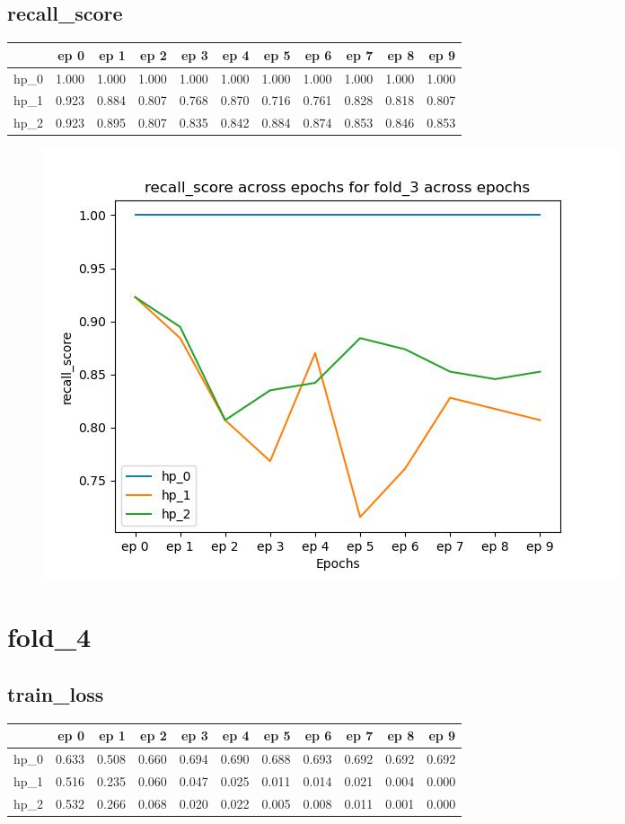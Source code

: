 \documentclass{article}
\begin{document}
\subsection{recall\_score}
\begin{tabular}{lrrrrrrrrrr}
\toprule
{} &   ep 0 &   ep 1 &   ep 2 &   ep 3 &   ep 4 &   ep 5 &   ep 6 &   ep 7 &   ep 8 &   ep 9 \\
\midrule
hp\_0 &  1.000 &  1.000 &  1.000 &  1.000 &  1.000 &  1.000 &  1.000 &  1.000 &  1.000 &  1.000 \\
hp\_1 &  0.923 &  0.884 &  0.807 &  0.768 &  0.870 &  0.716 &  0.761 &  0.828 &  0.818 &  0.807 \\
hp\_2 &  0.923 &  0.895 &  0.807 &  0.835 &  0.842 &  0.884 &  0.874 &  0.853 &  0.846 &  0.853 \\
\bottomrule
\end{tabular}

\begin{figure}[H]
\includegraphics[scale = 0.75]{fold_3/recall_score}
\end{figure}
\section{fold\_4}
\subsection{train\_loss}
\begin{tabular}{lrrrrrrrrrr}
\toprule
{} &   ep 0 &   ep 1 &   ep 2 &   ep 3 &   ep 4 &   ep 5 &   ep 6 &   ep 7 &   ep 8 &   ep 9 \\
\midrule
hp\_0 &  0.633 &  0.508 &  0.660 &  0.694 &  0.690 &  0.688 &  0.693 &  0.692 &  0.692 &  0.692 \\
hp\_1 &  0.516 &  0.235 &  0.060 &  0.047 &  0.025 &  0.011 &  0.014 &  0.021 &  0.004 &  0.000 \\
hp\_2 &  0.532 &  0.266 &  0.068 &  0.020 &  0.022 &  0.005 &  0.008 &  0.011 &  0.001 &  0.000 \\
\bottomrule
\end{tabular}
\end{document}
